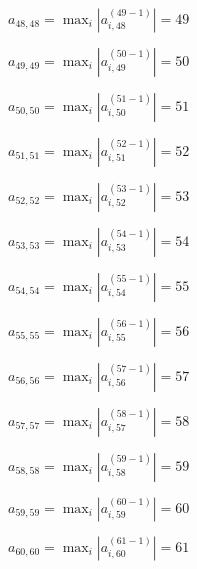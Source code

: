 \documentclass[a4paper,12pt]{article}
\begin{document}
$a _{ 48, 48 } =  \max _i |a _{ i, 48 } ^{ (49 - 1) } | = 49$

$a _{ 49, 49 } =  \max _i |a _{ i, 49 } ^{ (50 - 1) } | = 50$

$a _{ 50, 50 } =  \max _i |a _{ i, 50 } ^{ (51 - 1) } | = 51$

$a _{ 51, 51 } =  \max _i |a _{ i, 51 } ^{ (52 - 1) } | = 52$

$a _{ 52, 52 } =  \max _i |a _{ i, 52 } ^{ (53 - 1) } | = 53$

$a _{ 53, 53 } =  \max _i |a _{ i, 53 } ^{ (54 - 1) } | = 54$

$a _{ 54, 54 } =  \max _i |a _{ i, 54 } ^{ (55 - 1) } | = 55$

$a _{ 55, 55 } =  \max _i |a _{ i, 55 } ^{ (56 - 1) } | = 56$

$a _{ 56, 56 } =  \max _i |a _{ i, 56 } ^{ (57 - 1) } | = 57$

$a _{ 57, 57 } =  \max _i |a _{ i, 57 } ^{ (58 - 1) } | = 58$

$a _{ 58, 58 } =  \max _i |a _{ i, 58 } ^{ (59 - 1) } | = 59$

$a _{ 59, 59 } =  \max _i |a _{ i, 59 } ^{ (60 - 1) } | = 60$

$a _{ 60, 60 } =  \max _i |a _{ i, 60 } ^{ (61 - 1) } | = 61$
\end{document}
